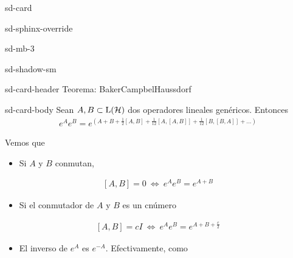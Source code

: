 \documentclass[letterpaper,10pt,english]{jupyterBook}
\newcommand{\Hil}{{\cal H}}
\begin{document}
\begin{sphinxuseclass}{sd-card}
\begin{sphinxuseclass}{sd-sphinx-override}
\begin{sphinxuseclass}{sd-mb-3}
\begin{sphinxuseclass}{sd-shadow-sm}
\begin{sphinxuseclass}{sd-card-header}
\sphinxAtStartPar
Teorema: Baker\sphinxhyphen{}Campbel\sphinxhyphen{}Haussdorf

\end{sphinxuseclass}
\begin{sphinxuseclass}{sd-card-body}
\sphinxAtStartPar
Sean \(A,B\subset{\rm L}(\Hil)\) dos operadores lineales genéricos. Entonces
\begin{equation*}
\begin{split}
e^A e^B = e^{\left({A+B + \frac{1}{2}[A,B] + \frac{1}{12}[A,[A,B]]+ \frac{1}{12}[B,[B,A]] + ...}\right)}
\end{split}
\end{equation*}
\end{sphinxuseclass}
\end{sphinxuseclass}
\end{sphinxuseclass}
\end{sphinxuseclass}
\end{sphinxuseclass}
\sphinxAtStartPar
Vemos que
\begin{itemize}
\item {} 
\sphinxAtStartPar
Si \(A\) y \(B\) conmutan,

\end{itemize}
\begin{equation*}
\begin{split}[A,B]=0 ~\Leftrightarrow ~e^A e^B = e^{A+B}\end{split}
\end{equation*}\begin{itemize}
\item {} 
\sphinxAtStartPar
Si el conmutador de \(A\) y \(B\)  es un c\sphinxhyphen{}número

\end{itemize}
\begin{equation*}
\begin{split}[A,B]= c I  ~\Leftrightarrow ~  e^A e^B = e^{A+B + \frac{c}{2}}\end{split}
\end{equation*}\begin{itemize}
\item {} 
\sphinxAtStartPar
El inverso de \(e^A\) es \(e^{-A}\). Efectivamente, como

\end{itemize}
\end{document}
